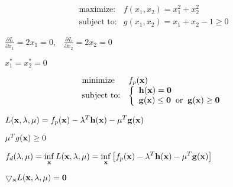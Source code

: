 \documentclass{article}
\def\lthtmlcheckvsize{\ifdim\ht\sizebox<\vsize 
  \ifdim\wd\sizebox<\hsize\expandafter\hfill\fi \expandafter\vfill
  \else\expandafter\vss\fi}%
\begin{document}
{\newpage\clearpage
{}%
\begin{displaymath}\begin{array}{ll}
\mbox{maximize:} & f(x_1,x_2)=x^2_1+x^2_2\\
\mbox{subject to:} & g(x_1,x_2)=x_1+x_2-1\ge 0
\end{array}\end{displaymath}%
\lthtmldisplayZ
\lthtmlcheckvsize\clearpage}

{\newpage\clearpage
{}%
$\displaystyle \frac{\partial L}{\partial x_1}=2x_1=0,\;\;\;
\frac{\partial L}{\partial x_2}=2x_2=0$%
\lthtmlindisplaymathZ
\lthtmlcheckvsize\clearpage}

{\newpage\clearpage
{}%
$ x_1^*=x_2^*=0$%
\lthtmlindisplaymathZ
\lthtmlcheckvsize\clearpage}

{\newpage\clearpage
{}%
\begin{displaymath}\begin{array}{ll}
\mbox{minimize} & f_p({\bf x})\\
\mbox{subject to:} &
\left\{ \begin{array}{l}
{\bf h}({\bf x})={\bf0}\\
{\bf g}({\bf x})\le{\bf0}\;\;\mbox{or}\;\;{\bf g}({\bf x})\ge{\bf0}
\end{array} \right.
\end{array}\end{displaymath}%
\lthtmldisplayZ
\lthtmlcheckvsize\clearpage}

{\newpage\clearpage
{}%
$\displaystyle L({\bf x},{\bf\lambda},{\bf\mu})
=f_p({\bf x})-{\bf\lambda}^T{\bf h}({\bf x})-{\bf\mu}^T{\bf g}({\bf x})$%
\lthtmlindisplaymathZ
\lthtmlcheckvsize\clearpage}

{\newpage\clearpage
{}%
$ \mu^T g({\bf x})\ge 0$%
\lthtmlindisplaymathZ
\lthtmlcheckvsize\clearpage}

{\newpage\clearpage
{}%
$\displaystyle f_d({\bf\lambda},{\bf\mu})
=\inf_{\bf x} L({\bf x},{\bf\lambda},{\bf\mu})
=\inf_{\bf x}\left[ f_p({\bf x})-{\bf\lambda}^T{\bf h}({\bf x})
-{\bf\mu}^T{\bf g}({\bf x})\right]$%
\lthtmlindisplaymathZ
\lthtmlcheckvsize\clearpage}

{\newpage\clearpage
{}%
$ \bigtriangledown_{\bf x}L({\bf x},{\bf\lambda},{\bf\mu})={\bf0}$%
\lthtmlindisplaymathZ
\lthtmlcheckvsize\clearpage}
\end{document}
